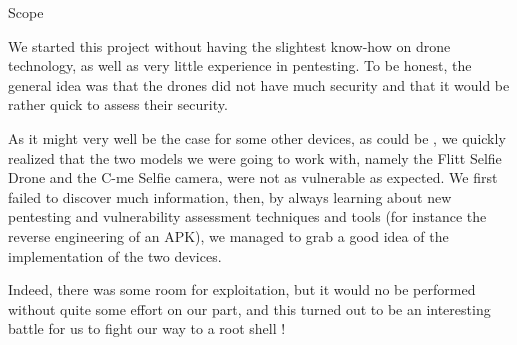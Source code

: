 \begin{chaptercover}{Scope}
\begin{discussion}
We started this project without having the slightest know-how on drone technology, as well as very little experience in pentesting. To be honest, the general idea was that the drones did not have much security and that it would be rather quick to assess their security.
 
As it might very well be the case for some other devices, as could be , we quickly realized that the two models we were going to work with, namely the Flitt Selfie Drone and the C-me Selfie camera, were not as vulnerable as expected. We first failed to discover much information, then, by always learning about new pentesting and vulnerability assessment techniques and tools (for instance the reverse engineering of an APK), we managed to grab a good idea of the implementation of the two devices.

Indeed, there was some room for exploitation, but it would no be performed without quite some effort on our part, and this turned out to be an interesting battle for us to fight our way to a root shell !
\end{discussion}

\end{chaptercover}
